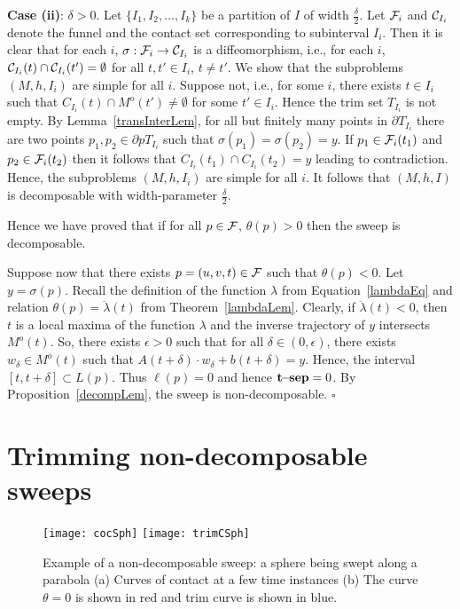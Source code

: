 \documentclass{elsart5p}
\newcommand{\sep}{{\bf t\!\!-\!\!sep}}
\begin{document}
{\bf Case (ii)}: $\delta > 0$.
Let $\{ I_1, I_2, \ldots, I_k \}$ be a partition of $I$ of width $\frac{\delta}{2}$.  Let ${\cal F}_i$ and ${\cal C}_{I_i}$ 
denote the funnel and the contact set corresponding to subinterval $I_i$.  Then it is clear that for each $i$,
$\sigma: {\cal F}_i \to {\cal C}_{I_i}$ is a diffeomorphism, i.e., for each $i$,
${\cal C}_{I_i}(t) \cap {\cal C}_{I_i}(t') = \emptyset$ for all $t, t' \in I_i$, $t \neq t'$. 
We show that the subproblems $(M,h,I_i)$ are simple for all $i$.  Suppose not, i.e., 
for some $i$, there exists $t \in I_i$ such that $C_{I_i}(t) \cap M^o(t') \neq \emptyset$ for some 
$t' \in I_i$.  Hence the trim set $T_{I_i}$ is not empty.  By Lemma~\ref{transInterLem}, for all but finitely 
many points in 
 $ \partial T_{I_i}$ there are two points $p_1, p_2 \in \partial pT_{I_i}$ such 
that $\sigma(p_1)= \sigma(p_2) = y$.  If $p_1 \in {\cal F}_i(t_1)$ and $p_2 \in {\cal F}_i(t_2)$ then 
it follows that $C_{I_i}(t_1) \cap C_{I_i}(t_2) = y$ leading to contradiction.
Hence, the subproblems $(M,h,I_i)$ are simple for all $i$.  
It follows that $(M,h,I)$ is decomposable with width-parameter $\frac{\delta}{2}$.


Hence we have proved that if for all $p \in {\cal F}$, $\theta(p) > 0$ then the sweep is decomposable.


Suppose now that there exists $p=(u,v,t) \in {\cal F}$ such that $\theta(p) < 0$.  Let $y = \sigma(p)$.  
Recall the definition of the function $\lambda$ from Equation~\ref{lambdaEq} and relation 
$\theta(p) = \ddot{\lambda}(t)$ from Theorem~\ref{lambdaLem}.  Clearly, if $\ddot{\lambda}(t) < 0$,  
then $t$ is a local maxima of the function $\lambda$ and the inverse trajectory of $y$ intersects 
$M^o(t)$.
So, there exists $\epsilon > 0$ such that for all $\delta \in (0, \epsilon)$, 
there exists $w_{\delta} \in M^o(t)$ such that $A(t + \delta) \cdot w_{\delta} + b(t + \delta) = y$.  
Hence, the interval $[t, t+\delta] \subset L(p)$.  Thus $\ell(p) = 0$ and hence $\sep = 0$.
By Proposition~\ref{decompLem}, the sweep is non-decomposable.
\hfill $\square$


\section{Trimming non-decomposable sweeps} \label{nonDecompSec}

\begin{figure}
 \centering
 \texttt{[image: cocSph]}
 \texttt{[image: trimCSph]}
 \caption{Example of a non-decomposable sweep: a sphere being swept along a parabola (a) Curves of contact at a few time instances (b) The curve $\theta = 0$ is shown in red and trim curve is shown in blue.}
 \label{nonDecompSphereFig}
\end{figure}
\end{document}

